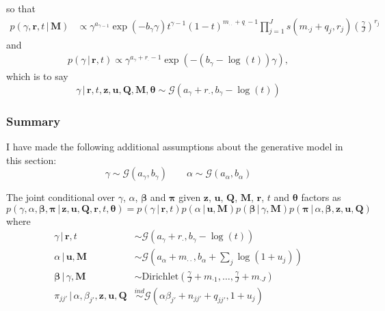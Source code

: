 \documentclass[12pt,letterpaper]{report}
\newcommand{\Gamm}[2]{\mathcal{G}(#1,#2)}
\newcommand{\given}{\, \vert \,}
\newcommand{\bM}{\mathbf{M}}
\newcommand{\bQ}{\mathbf{Q}}
\newcommand{\bz}{\mathbf{z}}
\newcommand{\bu}{\mathbf{u}}
\newcommand{\br}{\mathbf{r}}
\newcommand{\bbeta}{\boldsymbol{\beta}}
\newcommand{\btheta}{\boldsymbol{\theta}}
\newcommand{\bpi}{\boldsymbol{\pi}}
\begin{document}
so that
\begin{align}
  \label{eq:10}
  p(\gamma, \br, t \given \bM) &\propto \gamma^{a_{\gamma - 1}}
  \exp(-b_{\gamma}\gamma) t^{\gamma - 1}(1-t)^{m_{\cdot\cdot} +
    q_{\cdot} - 1} \prod_{j=1}^J s(m_{\cdot j} + q_j, r_j)
  \left(\frac{\gamma}{J}\right)^{r_j}
\end{align}
and
\begin{align}
  \label{eq:11}
  p(\gamma \given \br, t) \propto \gamma^{a_\gamma +
    r_{\cdot} - 1} \exp(-(b_{\gamma} - \log(t)) \gamma),
\end{align}
which is to say
\begin{equation}
  \label{eq:18}
  \gamma \given \br, t, \bz, \bu, \bQ, \bM, \btheta \sim \Gamm{a_{\gamma} + r_{\cdot}}{b_{\gamma} - \log(t)}
\end{equation}

\subsubsection{Summary}

I have made the following additional assumptions about the generative
model in this section:
\begin{equation}
  \label{eq:100}
  \gamma \sim \Gamm{a_{\gamma}}{b_{\gamma}} \qquad \alpha \sim \Gamm{a_{\alpha}}{b_{\alpha}}
\end{equation}

The joint conditional over $\gamma$, $\alpha$, $\bbeta$ and $\bpi$
given $\bz$, $\bu$, $\bQ$, $\bM$, $\br$, $t$ and $\btheta$ factors as
\begin{equation}
  \label{eq:46}
  p(\gamma, \alpha, \bbeta, \bpi \given \bz, \bu, \bQ, \br, t,
  \btheta) = p(\gamma \given \br, t) p(\alpha \given \bu, \bM) p(\bbeta
  \given \gamma, \bM) p(\bpi \given \alpha, \bbeta, \bz, \bu, \bQ)
\end{equation}
where
\begin{align}
  \label{eq:64}
  \gamma \given \br, t &\sim \Gamm{a_{\gamma} + r_{\cdot}}{b_{\gamma} -
    \log(t)} \\
  \alpha \given \bu, \bM &\sim \Gamm{a_{\alpha} +
    m_{\cdot\cdot}}{b_{\alpha} + \sum_j \log(1 + u_j)} \\
  \bbeta \given \gamma, \bM &\sim \mathrm{Dirichlet}(\frac{\gamma}{J} + m_{\cdot 1},
  \dots, \frac{\gamma}{J} + m_{\cdot J}) \\
  \pi_{jj'} \given \alpha, \beta_{j'}, \bz, \bu, \bQ
  &\stackrel{ind}{\sim} \Gamm{\alpha\beta_{j'} + n_{jj'} + q_{jj'}}{1 +
  u_j}
\end{align}
\end{document}
